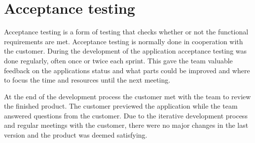 \section{Acceptance testing}
Acceptance testing is a form of testing that checks whether or not the functional requirements are met. Acceptance testing is normally done in cooperation with the customer. During the development of the application acceptance testing was done regularly, often once or twice each sprint. This gave the team valuable feedback on the applications status and what parts could be improved and where to focus the time and resources until the next meeting.

At the end of the development process the customer met with the team to review the finished product. The customer previewed the application while the team answered questions from the customer. Due to the iterative development process and regular meetings with the customer, there were no major changes in the last version and the product was deemed satisfying.